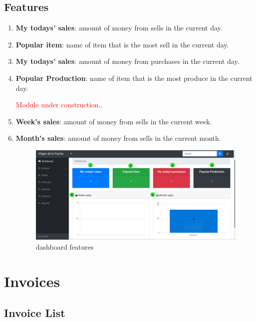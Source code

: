 \documentclass[a4paper,11pt]{refart}
\newcommand\InConstruction{\textcolor{red}{Module under construction.}}
\begin{document}
\subsection{Features}
\begin{enumerate}
	\item \textbf{My todays' sales}: amount of money from sells in the current day.
	\item \textbf{Popular item}: name of item that is the most sell in the current day. 
	\item \textbf{My todays' sales}: amount of money from purchases in the current day.
	\item \textbf{Popular Production}: name of item that is the most produce in the current day. 
		\medskip
	\begin{leftbar}
	 \InConstruction.
	\end{leftbar} 
	\item \textbf{Week's sales}: amount of money from sells in the current week.
	\item \textbf{Month's sales}: amount of money from sells in the current month.
	\begin{figure}[H]\centering
		\includegraphics[width=\textwidth]{images/dashboard}
		\caption{dashboard features}
		\label{fig:dashboard}
	\end{figure}
\end{enumerate}
	
\section{Invoices}
\subsection{Invoice List}\label{section:invoice_list}
\end{document}
